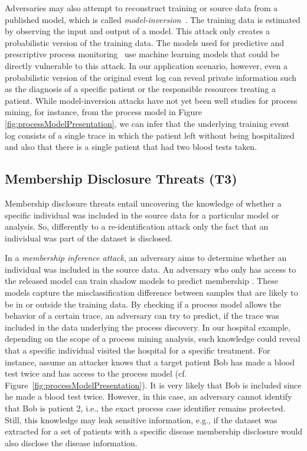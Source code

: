 \documentclass[manuscript]{acmart}
\begin{document}
Adversaries may also attempt to reconstruct training or source data from a published model, which is called \textit{model-inversion}~\cite{FredriksonJR15}. The training data is estimated by observing the input and output of a model. This attack only creates a probabilistic version of the training data. The models used for predictive and prescriptive process monitoring~\cite{fahrenkrog2019fire,maggi2014predictive} use machine learning models that could be directly vulnerable to this attack. In our application scenario, however, even a probabilistic version of the original event log can reveal private information such as the diagnosis of a specific patient or the responsible resources treating a patient. While model-inversion attacks have not yet been well studies for process mining, for instance, from the process model in Figure \ref{fig:processModelPresentation}, we can infer that the underlying training event log consists of a single trace in which the patient left without being hospitalized and also that there is a single patient that had two blood tests taken.  

\subsection{Membership Disclosure Threats (T3)}
Membership disclosure threats entail uncovering the knowledge of whether a specific individual was included in the source data for a particular model or analysis. So, differently to a re-identification attack only the fact that an individual was part of the dataset is disclosed. 

In a \textit{membership inference attack}, an adversary aims to determine whether an individual was included in the source data. An adversary who only has access to the released model can train shadow models to predict membership \cite{ShokriSSS17}. These models capture the misclassification difference between samples that are likely to be in or outside the training data. By checking if a process model allows the behavior of a certain trace, an adversary can try to predict, if the trace was included in the data underlying the process discovery. In our hospital example, depending on the scope of a process mining analysis, such knowledge could reveal that a specific individual visited the hospital for a specific treatment. For instance, assume an attacker knows that a target patient Bob has made a blood test twice and has access to the process model (cf. Figure~\ref{fig:processModelPresentation}). It is very likely that Bob is included since he made a blood test twice. However, in this case, an adversary cannot identify that Bob is patient 2, i.e., the exact process case identifier remains protected. Still, this knowledge may leak sensitive information, e.g., if the dataset was extracted for a set of patients with a specific disease membership disclosure would also disclose the disease information.
\end{document}
